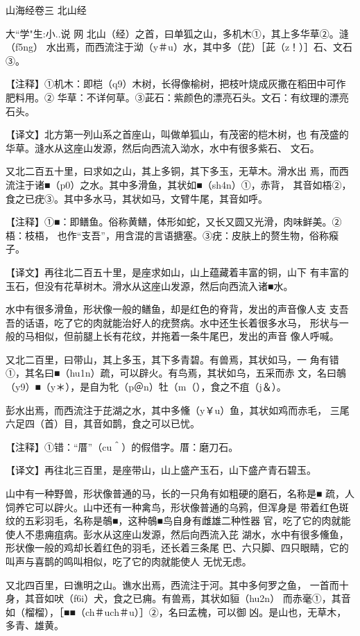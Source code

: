 \documentclass[a4paper,12pt,UTF8,twoside]{ctexbook}
\begin{document}
山海经卷三 北山经

大``学"生:小..说 网
北山（经）之首，曰单狐之山，多机木①，其上多华草②。漨（f5ng） 水出焉，而西流注于泑（y＃u）水，其中多（芘）［茈（z！）］石、文石③。

【注释】①机木：即桤（q9）木树，长得像榆树，把枝叶烧成灰撒在稻田中可作肥料用。② 华草：不详何草。③茈石：紫颜色的漂亮石头。文石：有纹理的漂亮石头。

【译文】北方第一列山系之首座山，叫做单狐山，有茂密的桤木树，也 有茂盛的华草。漨水从这座山发源，然后向西流入泑水，水中有很多紫石、 文石。

又北二百五十里，曰求如之山，其上多铜，其下多玉，无草木。滑水出 焉，而西流注于诸■（p0）之水。其中多滑鱼，其状如■（sh4n）①，赤背， 其音如梧②，食之已疣③。其中多水马，其状如马，文臂牛尾，其音如呼。

【注释】①■：即鳝鱼。俗称黄鳝，体形如蛇，又长又圆又光滑，肉味鲜美。②梧：枝梧， 也作“支吾”，用含混的言语搪塞。③疣：皮肤上的赘生物，俗称瘊子。

【译文】再往北二百五十里，是座求如山，山上蕴藏着丰富的铜，山下 有丰富的玉石，但没有花草树木。滑水从这座山发源，然后向西流入诸■水。

水中有很多滑鱼，形状像一般的鳝鱼，却是红色的脊背，发出的声音像人支 支吾吾的话语，吃了它的肉就能治好人的疣赘病。水中还生长着很多水马， 形状与一般的马相似，但前腿上长有花纹，并拖着一条牛尾巴，发出的声音 像人呼喊。

又北二百里，曰带山，其上多玉，其下多青碧。有兽焉，其状如马，一 角有错①，其名曰■（hu1n）疏，可以辟火。有鸟焉，其状如乌，五采而赤 文，名曰鵸（y9）■（y＊），是自为牝（p＠n）牡（m（），食之不疽（j＆）。

彭水出焉，而西流注于芘湖之水，其中多儵（y￥u）鱼，其状如鸡而赤毛， 三尾六足四（首）目，其音如鹊，食之可以已忧。

【注释】①错：“厝”（cu＾）的假借字。厝：磨刀石。

【译文】再往北三百里，是座带山，山上盛产玉石，山下盛产青石碧玉。

山中有一种野兽，形状像普通的马，长的一只角有如粗硬的磨石，名称是■ 疏，人饲养它可以辟火。山中还有一种禽鸟，形状像普通的乌鸦，但浑身是 带着红色斑纹的五彩羽毛，名称是鵸■，这种鵸■鸟自身有雌雄二种性器 官，吃了它的肉就能使人不患痈疽病。彭水从这座山发源，然后向西流入芘 湖水，水中有很多儵鱼，形状像一般的鸡却长着红色的羽毛，还长着三条尾 巴、六只脚、四只眼睛，它的叫声与喜鹊的鸣叫相似，吃了它的肉就能使人 无忧无虑。

又北四百里，曰谯明之山。谯水出焉，西流注于河。其中多何罗之鱼， 一首而十身，其音如吠（f6i）犬，食之已痈。有兽焉，其状如貆（hu2n） 而赤毫①，其音如（榴榴），［■■（ch＃uch＃u）］②，名曰孟槐，可以御 凶。是山也，无草木，多青、雄黄。
\end{document}
